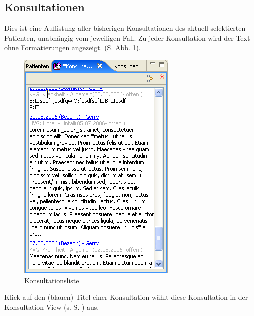 \subsection{Konsultationen}
Dies ist eine Auflistung aller bisherigen Konsultationen des aktuell
selektierten Patienten, unabhängig vom jeweiligen Fall.
 Zu jeder Konsultation
wird der Text ohne Formatierungen angezeigt. (S. Abb. \ref{fig:konslisteview}).
\begin{figure}[htp]
\begin{center}
  \includegraphics{images/konslisteview}
  \caption{Konsultationsliste}
  \label{fig:konslisteview}
\end{center}
\end{figure}
Klick auf den (blauen) Titel einer Konsultation wählt diese Konsultation in der
Konsultation-View (s. S. \pageref{konsview}) aus.

